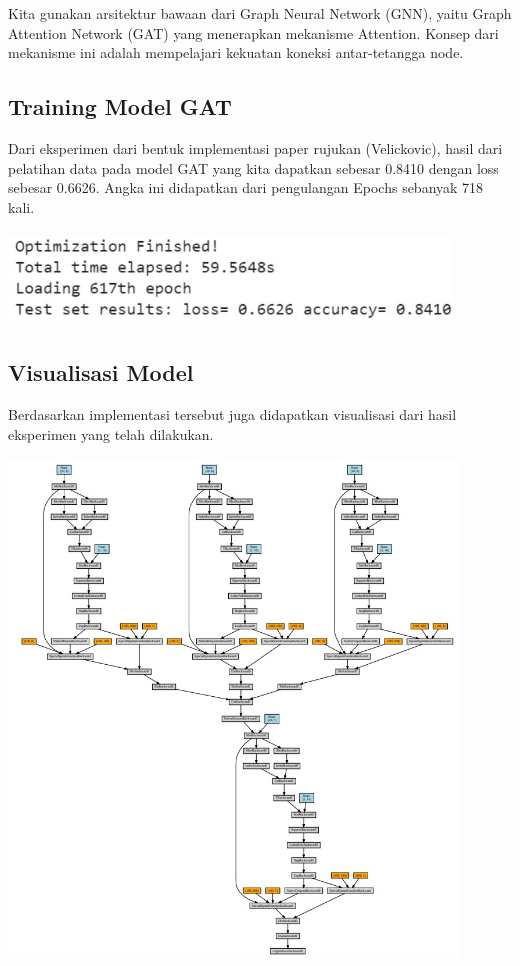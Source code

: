 \documentclass{article}
\begin{document}
Kita gunakan arsitektur bawaan dari Graph Neural Network (GNN), yaitu Graph Attention Network (GAT) yang menerapkan mekanisme Attention. Konsep dari mekanisme ini adalah mempelajari kekuatan koneksi antar-tetangga node.

\subsection{Training Model GAT}
Dari eksperimen dari bentuk implementasi paper rujukan (Velickovic)\cite{cite26}, hasil dari pelatihan data pada model GAT yang kita dapatkan sebesar 0.8410 dengan loss sebesar 0.6626. Angka ini didapatkan dari pengulangan Epochs sebanyak 718 kali.

\begin{center}
\includegraphics[width=4.64063in,height=0.97013in]{Picture/Fig11.jpg}
\end{center}

\subsection{Visualisasi Model}
Berdasarkan implementasi tersebut juga didapatkan visualisasi dari hasil eksperimen yang telah dilakukan.

\begin{center}
\includegraphics[width=4.71354in,height=5.22679in]{Picture/Fig10.jpg}
\end{center}
\end{document}
